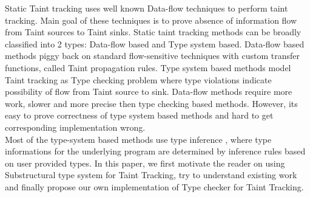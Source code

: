 \documentclass[11pt, pdftex]{article}
\begin{document}
Static Taint tracking \cite{Write03} uses well known Data-flow techniques to perform taint tracking. Main goal of these techniques is to prove absence of information flow from Taint sources to Taint sinks. Static taint tracking methods can be broadly classified into 2 types: Data-flow based and Type system based. Data-flow based methods piggy back on standard flow-sensitive techniques with custom transfer functions, called Taint propagation rules. Type system based methods model Taint tracking as Type checking problem where type violations indicate possibility of flow from Taint source to sink. Data-flow methods require more work, slower and more precise then type checking based methods. However, its easy to prove correctness of type system based methods and hard to get corresponding implementation wrong.\\
Most of the type-system based methods use type inference \cite{foster2002flow} \cite{johnson2004finding}, where type informations for the underlying program are determined by inference rules based on user provided types. In this paper, we first motivate the reader on using Substructural type system for Taint Tracking, try to understand existing work and finally propose our own implementation of Type checker for Taint Tracking.
\end{document}
